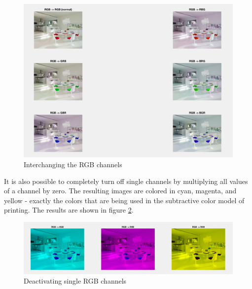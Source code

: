 \begin{figure}[!hbt]
  \includegraphics[width=\textwidth]{./img/task3.png}
  \caption{Interchanging the RGB channels}
  \label{fig:task3}
\end{figure}

It is also possible to completely turn off single channels by multiplying all values of a channel by zero. The resulting images are colored in cyan, magenta, and yellow - exactly the colors that are being used in the subtractive color model of printing. The results are shown in figure \ref{fig:task4}.

\begin{figure}[!hbt]
  \includegraphics[width=\textwidth]{./img/task4.png}
  \caption{Deactivating single RGB channels}
  \label{fig:task4}
\end{figure}